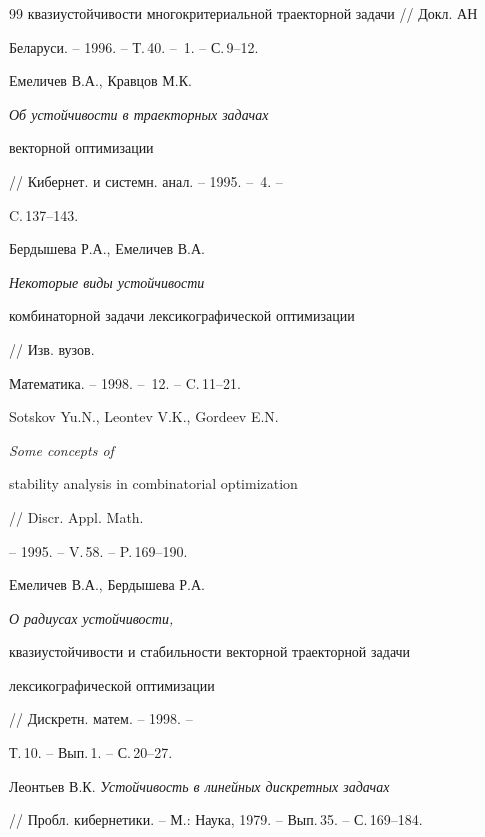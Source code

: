\begin{thebibliography}{99}
{квазиустойчивости многокритериальной траекторной задачи} // Докл. АН


Беларуси. -- 1996. -- Т.\,40. -- \No\,1. -- С.\,9--12.




Емеличев В.А., Кравцов М.К. {\it Об устойчивости в траекторных задачах


векторной оптимизации} // Кибернет. и системн. анал. -- 1995. -- \No\,4. --


C.\,137--143.




Бердышева Р.А., Емеличев В.А. {\it Некоторые виды устойчивости


комбинаторной задачи лексикографической оптимизации} // Изв. вузов.


Математика. -- 1998. -- \No\,12. -- C.\,11--21.




Sotskov Yu.N., Leontev V.K., Gordeev E.N. {\it Some concepts of


stability analysis in combinatorial optimization} // Discr. Appl. Math.


-- 1995. -- V.\,58. -- P.\,169--190.




Емеличев В.А., Бердышева Р.А. {\it О радиусах устойчивости,


квазиустойчивости и стабильности векторной траекторной задачи


лексикографической оптимизации} // Дискретн. матем. -- 1998. --


Т.\,10. -- Вып.\,1. -- С.\,20--27.




Леонтьев В.К. {\it Устойчивость в линейных дискретных задачах}


// Пробл. кибернетики. -- М.: Наука, 1979. -- Вып.\,35. -- С.\,169--184.





\end{thebibliography}





\vskip 2cm












\label{end}





